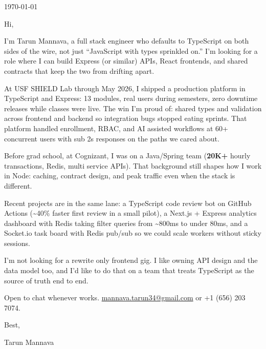 




\coverLetterHeading

\vspace{14pt}
\noindent\today

\vspace{14pt}
\noindent Hi,

I'm Tarun Mannava, a full stack engineer who defaults to TypeScript on both sides of the wire, not just ``JavaScript with types sprinkled on.'' I'm looking for a role where I can build Express (or similar) APIs, React frontends, and shared contracts that keep the two from drifting apart.

At USF SHIELD Lab through May 2026, I shipped a production platform in TypeScript and Express: 13 modules, real users during semesters, zero downtime releases while classes were live. The win I'm proud of: shared types and validation across frontend and backend so integration bugs stopped eating sprints. That platform handled enrollment, RBAC, and AI assisted workflows at 60+ concurrent users with sub 2s responses on the paths we cared about.

Before grad school, at Cognizant, I was on a Java/Spring team (\textbf{20K+} hourly transactions, Redis, multi service APIs). That background still shapes how I work in Node: caching, contract design, and peak traffic even when the stack is different.

Recent projects are in the same lane: a TypeScript code review bot on GitHub Actions (\textasciitilde40\% faster first review in a small pilot), a Next.js + Express analytics dashboard with Redis taking filter queries from \textasciitilde800ms to under 80ms, and a Socket.io task board with Redis pub/sub so we could scale workers without sticky sessions.

I'm not looking for a rewrite only frontend gig. I like owning API design and the data model too, and I'd like to do that on a team that treats TypeScript as the source of truth end to end.

Open to chat whenever works. \href{mailto:mannava.tarun34@gmail.com}{mannava.tarun34@gmail.com} or +1 (656) 203 7074.

Best,

\noindent Tarun Mannava


